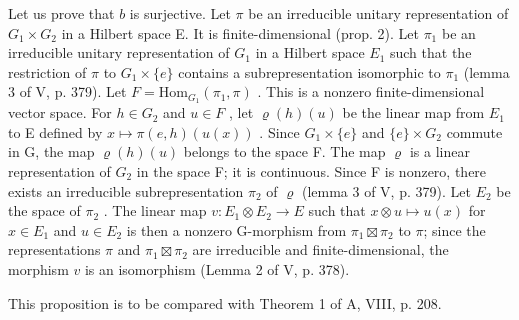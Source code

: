 Let us prove that \(b\) is surjective. Let \(\pi\) be an irreducible unitary representation of \(G_1 \times G_2\) in a Hilbert space E. It is finite-dimensional (prop. 2). Let \(\pi_1\) be an irreducible unitary representation of \(G_1\) in a Hilbert space \(E_1\) such that the restriction of \(\pi\) to \(G_1 \times \{e\}\) contains a subrepresentation isomorphic to \(\pi_1\) (lemma 3 of V, p. 379). Let \(F = \text{Hom}_{G_1}(\pi_1, \pi)\) . This is a nonzero finite-dimensional vector space. For \(h \in G_2\) and \(u \in F\) , let \(\varrho(h)(u)\) be the linear map from \(E_1\) to E defined by \(x \mapsto \pi(e, h)(u(x))\) . Since \(G_1 \times \{e\}\) and \(\{e\} \times G_2\) commute in G, the map \(\varrho(h)(u)\) belongs to the space F. The map \(\varrho\) is a linear representation of \(G_2\) in the space F; it is continuous. Since F is nonzero, there exists an irreducible subrepresentation \(\pi_2\) of \(\varrho\) (lemma 3 of V, p. 379). Let \(E_2\) be the space of \(\pi_2\) . The linear map \(v: E_1 \otimes E_2 \to E\) such that \(x \otimes u \mapsto u(x)\) for \(x \in E_1\) and \(u \in E_2\) is then a nonzero G-morphism from \(\pi_1 \boxtimes \pi_2\) to \(\pi\); since the representations \(\pi\) and \(\pi_1 \boxtimes \pi_2\) are irreducible and finite-dimensional, the morphism \(v\) is an isomorphism (Lemma 2 of V, p. 378).

This proposition is to be compared with Theorem 1 of A, VIII, p. 208.

